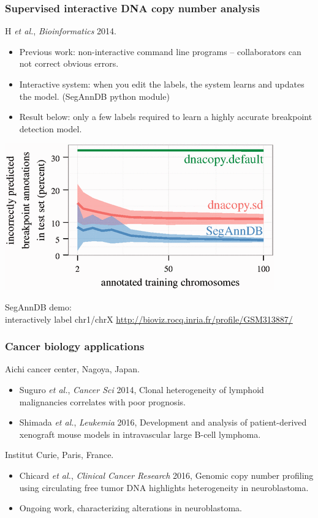 \documentclass{beamer}
\begin{document}
\begin{frame}
  \frametitle{Supervised interactive DNA copy number analysis}
  H {\it et al.}, {\it Bioinformatics} 2014.

  \begin{itemize}
  \item Previous work: non-interactive command line programs
    -- collaborators can not correct obvious
    errors.
  \item Interactive system: when you edit the labels, the system
    learns and updates the model. (SegAnnDB python module)
  \item Result below: only a few labels required to learn a highly accurate
    breakpoint detection model.
  \end{itemize}
  \begin{minipage}{0.5\linewidth}
    \includegraphics[width=\textwidth]{SegAnnDB-test-error-decreases}
  \end{minipage}
  \begin{minipage}[0.5\linewidth]{0.48\linewidth}
SegAnnDB demo:\\interactively label chr1/chrX
  \url{http://bioviz.rocq.inria.fr/profile/GSM313887/}
  \end{minipage}
\end{frame}

\begin{frame}
  \frametitle{Cancer biology applications}
  Aichi cancer center, Nagoya, Japan.
  \begin{itemize}
  \item Suguro {\it et al.}, {\it Cancer Sci} 2014, Clonal
    heterogeneity of lymphoid malignancies correlates with poor
    prognosis.
  \item Shimada {\it et al.}, {\it Leukemia} 2016, Development and
    analysis of patient-derived xenograft mouse models in
    intravascular large B-cell lymphoma.
  \end{itemize}
  Institut Curie, Paris, France.
  \begin{itemize}
  \item Chicard {\it et al.}, {\it Clinical Cancer Research} 2016,
    Genomic copy number profiling using circulating free tumor DNA
    highlights heterogeneity in neuroblastoma.
  \item Ongoing work, characterizing alterations in neuroblastoma.
  \end{itemize}
\end{frame}
\end{document}
